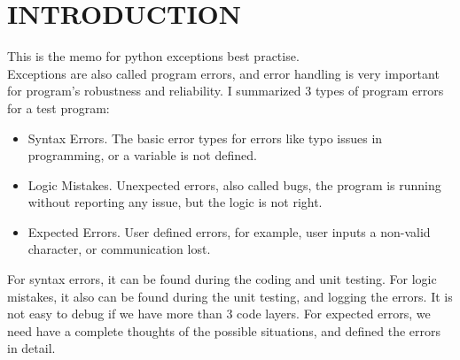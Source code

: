 \newcommand{\WorkWeek}{1332} %
\newcommand{\BossName}{Arden Chang} %
\newcommand{\BossInitials}{ARDN} %
\newcommand{\Author}{Qiling Bo} %
\newcommand{\AuthorInitials}{QIBO} %
\newcommand{\MemoNumber}{134} %
\newcommand{\Subject}{Python Exceptions} %
\newcommand{\Category}{Test development} %
\newcommand{\Distribution}{PZHO, MZFA, WEIQ, ARDN, RQB, BMOCHINA} %





\maketitle

\section{INTRODUCTION}
This is the memo for python exceptions best practise. \\
Exceptions are also called program errors, and error handling is very important for program's robustness and reliability.
I summarized 3 types of program errors for a test program:
\begin{itemize}
    \item
    Syntax Errors. The basic error types for errors like typo issues in programming, or a variable is not defined.
    \item
    Logic Mistakes. Unexpected errors, also called bugs, the program is running without reporting any issue, but the logic is not right. 
    \item
    Expected Errors. User defined errors, for example, user inputs a non-valid character, or communication lost.
\end{itemize}
For syntax errors, it can be found during the coding and unit testing. 
For logic mistakes, it also can be found during the unit testing, and logging the errors. It is not easy to debug if we have more than 3 code layers. 
For expected errors, we need have a complete thoughts of the possible situations, and defined the errors in detail.

